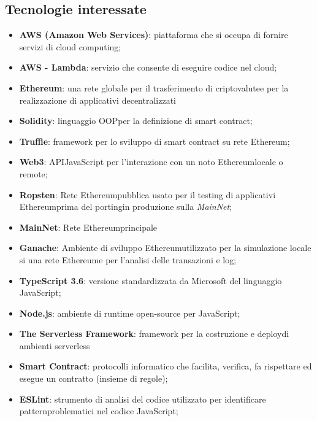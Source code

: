 \subsection{Tecnologie interessate}
\begin{itemize}
	\item \textbf{AWS (Amazon Web Services)}: piattaforma che si occupa di fornire servizi di cloud computing\glo;
	\item \textbf{AWS - Lambda}: servizio che consente di eseguire codice nel cloud;
	\item \textbf{Ethereum}: una rete globale per il trasferimento di criptovalute\glo e per la realizzazione di applicativi decentralizzati
	\item \textbf{Solidity}: linguaggio OOP\glo per la definizione di smart contract\glo;
	\item \textbf{Truffle}: framework per lo sviluppo di smart contract su rete Ethereum\glo;
	\item \textbf{Web3}: API\glo JavaScript per l'interazione con un noto Ethereum\glo locale o remote;
	\item \textbf{Ropsten}: Rete Ethereum\glo pubblica usato per il testing di applicativi Ethereum\glo prima del porting\glo in produzione sulla \textit{MainNet};
	\item \textbf{MainNet}: Rete Ethereum\glo principale
	\item \textbf{Ganache}: Ambiente di sviluppo Ethereum\glo utilizzato per la simulazione locale si una rete Ethereum\glo e per l'analisi delle transazioni e log;
	\item \textbf{TypeScript 3.6}: versione standardizzata da Microsoft del linguaggio JavaScript;
	\item \textbf{Node.js}: ambiente di runtime open-source per JavaScript;
	\item \textbf{The Serverless Framework}: framework per la costruzione e deploy\glo di ambienti serverless\glo
	\item \textbf{Smart Contract}: protocolli informatico che facilita, verifica, fa rispettare ed esegue un contratto (insieme di regole);
	\item \textbf{ESLint}: strumento di analisi del codice utilizzato per identificare pattern\glo problematici nel codice JavaScript;
\end{itemize}

